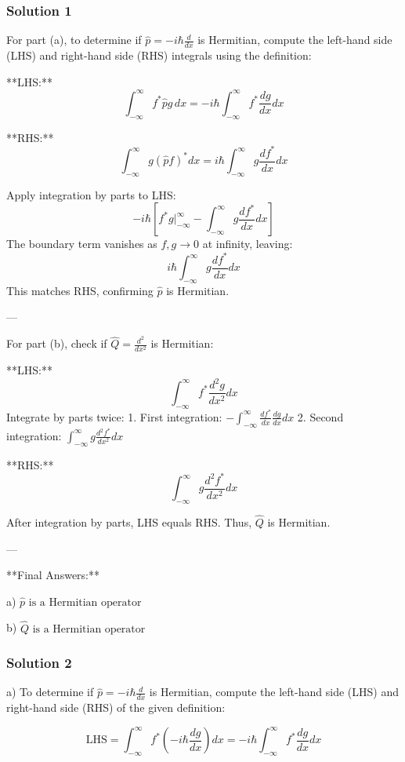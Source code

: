 \documentclass{article}
\begin{document}
\subsubsection{Solution 1}
For part (a), to determine if \(\hat{p} = -i\hbar \frac{d}{dx}\) is Hermitian, compute the left-hand side (LHS) and right-hand side (RHS) integrals using the definition:

**LHS:**
\[
\int_{-\infty}^{\infty} f^* \hat{p} g \, dx = -i\hbar \int_{-\infty}^{\infty} f^* \frac{dg}{dx} dx
\]

**RHS:**
\[
\int_{-\infty}^{\infty} g (\hat{p} f)^* dx = i\hbar \int_{-\infty}^{\infty} g \frac{df^*}{dx} dx
\]

Apply integration by parts to LHS:
\[
-i\hbar \left[ f^* g \bigg|_{-\infty}^{\infty} - \int_{-\infty}^{\infty} g \frac{df^*}{dx} dx \right]
\]
The boundary term vanishes as \(f, g \to 0\) at infinity, leaving:
\[
i\hbar \int_{-\infty}^{\infty} g \frac{df^*}{dx} dx
\]
This matches RHS, confirming \(\hat{p}\) is Hermitian.

---

For part (b), check if \(\hat{Q} = \frac{d^2}{dx^2}\) is Hermitian:

**LHS:**
\[
\int_{-\infty}^{\infty} f^* \frac{d^2 g}{dx^2} dx
\]
Integrate by parts twice:
1. First integration: \( - \int_{-\infty}^{\infty} \frac{df^*}{dx} \frac{dg}{dx} dx \)
2. Second integration: \( \int_{-\infty}^{\infty} g \frac{d^2 f^*}{dx^2} dx \)

**RHS:**
\[
\int_{-\infty}^{\infty} g \frac{d^2 f^*}{dx^2} dx
\]

After integration by parts, LHS equals RHS. Thus, \(\hat{Q}\) is Hermitian.

---

**Final Answers:**

a) \(\boxed{\hat{p} \text{ is a Hermitian operator}}\)

b) \(\boxed{\hat{Q} \text{ is a Hermitian operator}}\)

\subsubsection{Solution 2}
a) To determine if \(\hat{p} = -i\hbar \frac{d}{dx}\) is Hermitian, compute the left-hand side (LHS) and right-hand side (RHS) of the given definition:

\[
\text{LHS} = \int_{-\infty}^{\infty} f^* \left(-i\hbar \frac{dg}{dx}\right) dx = -i\hbar \int_{-\infty}^{\infty} f^* \frac{dg}{dx} dx
\]
\end{document}
